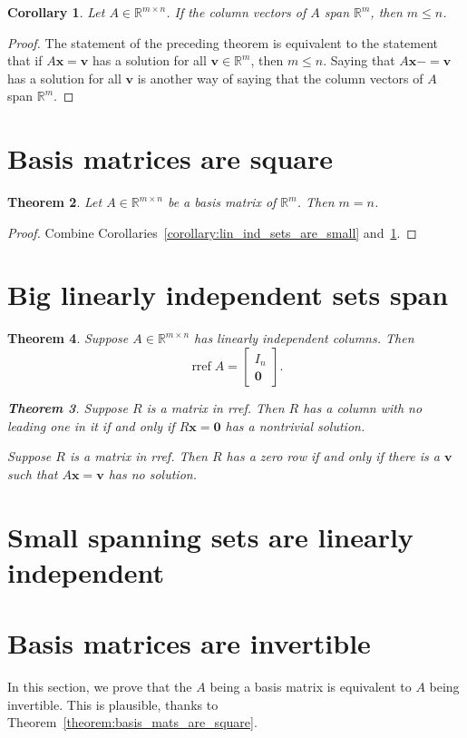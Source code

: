 \documentclass[12pt]{amsart}
\newcommand{\RR}{\mathbb{R}}
\DeclareMathOperator{\rref}{rref}
\newtheorem{theorem}{Theorem}[section]
\newtheorem{corollary}[theorem]{Corollary}
\theoremstyle{definition}
\newcommand{\bv}{\mathbf{v}}
\newcommand{\bx}{\mathbf{x}}
\newcommand{\bzero}{\mathbf{0}}
\newcommand{\mat}[1]{\begin{bmatrix}#1\end{bmatrix}}
\newcommand{\Rmn}{\RR^{m\times n}}
\begin{document}
\begin{corollary}\label{corollary:spanning_sets_are_big}
	Let $A\in\Rmn$.
	If the column vectors of $A$ span $\RR^m$, then $m \leq n$.
\end{corollary}
\begin{proof}
	The statement of the preceding theorem is equivalent to the statement that if $A\bx=\bv$ has a solution for all
	$\bv\in\RR^m$, then $m\leq n$.
	Saying that $A\bx-=\bv$ has a solution for all $\bv$ is	another way of saying that the column vectors of $A$ span 
	$\RR^m$.
\end{proof}

\section{Basis matrices are square}

\begin{theorem}
	Let $A\in\RR^{m\times n}$ be a basis matrix of $\RR^m$. Then $m=n$.
\end{theorem}
\begin{proof}
	Combine Corollaries~\ref{corollary:lin_ind_sets_are_small} and~\ref{corollary:spanning_sets_are_big}.
\end{proof}

\section{Big linearly independent sets span}

\begin{theorem}
Suppose $A\in\RR^{m\times n}$ has linearly independent columns. Then
\[
	\rref A = \mat{I_n\\\bzero}.
\]

\begin{theorem}
	Suppose $R$ is a matrix in rref. Then $R$ has a column with no leading one in it if and only if $R\bx = \bzero$ has a nontrivial solution.

	Suppose $R$ is a matrix in rref. Then $R$ has a zero row if and only if there is a $\bv$ such that $A\bx=\bv$ has no solution.
\end{theorem}

\end{theorem}

\section{Small spanning sets are linearly independent}

\section{Basis matrices are invertible}
In this section, we prove that the $A$ being a basis matrix is equivalent to $A$ being invertible.
This is plausible, thanks to Theorem~\ref{theorem:basis_mats_are_square}.
\end{document}
